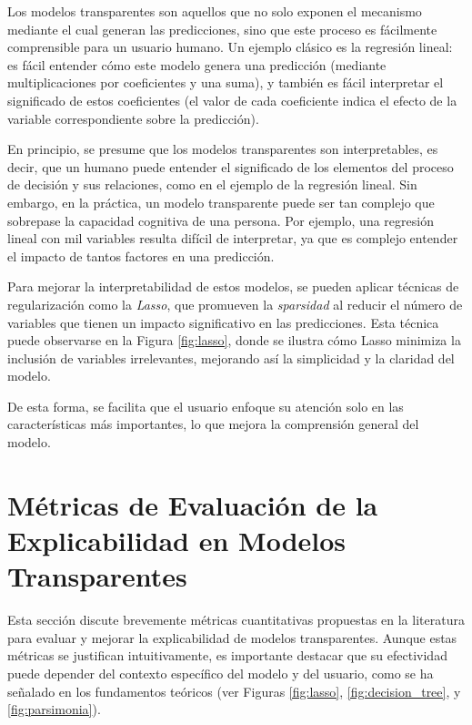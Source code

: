 Los modelos transparentes son aquellos que no solo exponen el mecanismo mediante el cual generan las predicciones, sino que este proceso es fácilmente comprensible para un usuario humano. Un ejemplo clásico es la regresión lineal: es fácil entender cómo este modelo genera una predicción (mediante multiplicaciones por coeficientes y una suma), y también es fácil interpretar el significado de estos coeficientes (el valor de cada coeficiente indica el efecto de la variable correspondiente sobre la predicción).

En principio, se presume que los modelos transparentes son interpretables, es decir, que un humano puede entender el significado de los elementos del proceso de decisión y sus relaciones, como en el ejemplo de la regresión lineal. Sin embargo, en la práctica, un modelo transparente puede ser tan complejo que sobrepase la capacidad cognitiva de una persona. Por ejemplo, una regresión lineal con mil variables resulta difícil de interpretar, ya que es complejo entender el impacto de tantos factores en una predicción.

Para mejorar la interpretabilidad de estos modelos, se pueden aplicar técnicas de regularización como la \textit{Lasso}, que promueven la \textit{sparsidad} al reducir el número de variables que tienen un impacto significativo en las predicciones. Esta técnica puede observarse en la Figura \ref{fig:lasso}, donde se ilustra cómo Lasso minimiza la inclusión de variables irrelevantes, mejorando así la simplicidad y la claridad del modelo.

De esta forma, se facilita que el usuario enfoque su atención solo en las características más importantes, lo que mejora la comprensión general del modelo.






\section{Métricas de Evaluación de la Explicabilidad en Modelos Transparentes}

Esta sección discute brevemente métricas cuantitativas propuestas en la literatura para evaluar y mejorar la explicabilidad de modelos transparentes. Aunque estas métricas se justifican intuitivamente, es importante destacar que su efectividad puede depender del contexto específico del modelo y del usuario, como se ha señalado en los fundamentos teóricos (ver Figuras \ref{fig:lasso}, \ref{fig:decision_tree}, y \ref{fig:parsimonia}).

